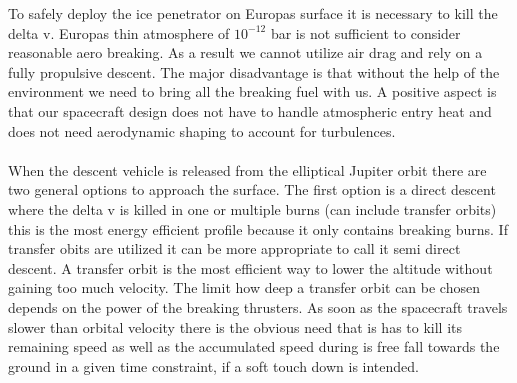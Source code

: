 \label{sec:Descent_Profile}
To safely deploy the ice penetrator on Europas surface it is necessary to kill the delta v. Europas thin atmosphere of $10^{-{12}}$ bar is not sufficient to consider reasonable aero breaking. As a result we cannot utilize air drag and rely on a fully propulsive descent. The major disadvantage is that without the help of the environment we need to bring all the breaking fuel with us. A positive aspect is that our spacecraft design does not have to handle atmospheric entry heat and does not need aerodynamic shaping to account for turbulences.\\
\\
When the descent vehicle is released from the elliptical Jupiter orbit there are two general options to approach the surface. The first option is a direct descent where the delta v is killed in one or multiple burns (can include transfer orbits) this is the most energy efficient profile because it only contains breaking burns. If transfer obits are utilized it can be more appropriate to call it semi direct descent. A transfer orbit is the most efficient way to lower the altitude without gaining too much velocity. The limit how deep a transfer orbit can be chosen depends on the power of the breaking thrusters. As soon as the spacecraft travels slower than orbital velocity there is the obvious need that is has to kill its remaining speed as well as the accumulated speed during is free fall towards the ground in a given time constraint, if a soft touch down is intended. \\
